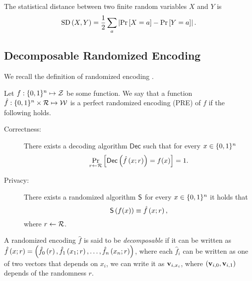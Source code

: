 \documentclass{llncs}
\renewcommand{\Z}{\mathcal{Z}}
\renewcommand{\v}{\myvec{v}}
\renewcommand{\SD}{\operatorname*{SD}}
\begin{document}
\begin{definition}\label{def:statDist}
	The statistical distance between two finite random variables $X$ and $Y$ is
	$$\SD\of{X,Y}=\frac12\sum_{a}\abs{\pr{X=a}-\pr{Y=a}}.$$
\end{definition}

\subsection{Decomposable Randomized Encoding}
We recall the definition of randomized encoding \cite{Yao86,AIK04}.

\begin{definition}
Let $f:\zo^n\mapsto\Z$ be some function. We say that a function $\hat{f}:\{0,1\}^n\times\mathcal{R}\mapsto\mathcal{W}$ is a perfect randomized encoding (PRE) of $f$ if the following holds.

\begin{description}
	\item[Correctness:] There exists a decoding algorithm $\mathsf{Dec}$ such that for every $x\in\{0,1\}^n$
    $$\Pr_{r\leftarrow\mathcal{R}}\left[\mathsf{Dec}\left ( \hat{f}\left ( x;r \right ) \right )=f(x)\right]=1.$$
    
    \item[Privacy:] There exists a randomized algorithm $\mathsf{S}$ for every $x\in\{0,1\}^n$ it holds that
    $$\mathsf{S}\left ( f(x) \right )\equiv\hat{f}\left ( x;r \right ),$$
    where $r\leftarrow\mathcal{R}$.
\end{description}
\end{definition}

\begin{definition}
A randomized encoding $\hat{f}$ is said to be \emph{decomposable} if it can be written as $\hat{f}\left ( x;r \right )=\left ( \hat{f}_0\left ( r \right ),\hat{f}_1\left ( x_1;r \right ),\ldots,\hat{f}_n\left ( x_n;r \right ) \right )$, where each $\hat{f}_i$ can be written as one of two vectors that depends on $x_i$, \ie we can write it as $\v_{i,x_i}$, where $(\v_{i,0},\v_{i,1})$ depends of the randomness $r$.
\end{definition}
\end{document}
